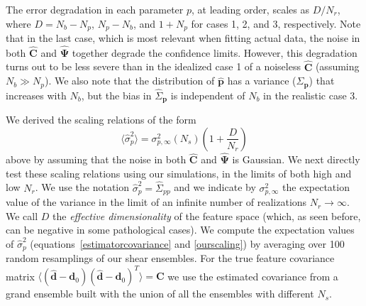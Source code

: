 \documentclass[reprint,aps,prd,superscriptaddress,showkeys,showpacs]{revtex4-1}
\newcommand{\bb}[1]{\mathbf{#1}}
\newcommand{\bbh}[1]{\mathbf{\hat{#1}}}
\newcommand{\h}[1]{\hat{#1}}
\begin{document}
%
The error degradation in each parameter $p$, at leading order, scales
as $D/N_r$, where $D=N_b-N_p$, $N_p-N_b$, and $1+N_p$ for cases 1, 2,
and 3, respectively.
Note that in the last case, which is most relevant when fitting actual
data, the noise in both $\bbh{C}$ and $\bbh{\Psi}$ together degrade
the confidence limits.  However, this degradation turns out to be less
severe than in the idealized case 1 of a noiseless $\bbh{C}$ (assuming
$N_b\gg N_p$).  We also note that the distribution of $\bbh{p}$ has a
variance ($\Sigma_\bb{p}$) that increases with $N_b$, but the bias in
$\h{\Sigma}_\bb{p}$ is independent of $N_b$ in the realistic case 3.

We derived the scaling relations of the form
%
\begin{equation}
\label{ourscaling}
\langle\h{\sigma}_p^2\rangle = \sigma^2_{p,\infty}(N_s)\left(1+\frac{D}{N_r}\right)
\end{equation}
%
above by assuming that the noise in both $\bbh{C}$ and $\bbh{\Psi}$ is
Gaussian.  We next directly test these scaling relations using our
simulations, in the limits of both high and low $N_r$.
We use the notation $\h{\sigma}^2_p=\h{\Sigma}_{pp}$ 
and we indicate by $\sigma^2_{p,\infty}$ the expectation value of the
variance in the limit of an infinite number of realizations
$N_r\rightarrow\infty$.  We call $D$ the \textit{effective
  dimensionality} of the feature space (which, as seen before, can be
negative in some pathological cases).
We compute the expectation values of $\h{\sigma}^2_p$
(equations~\ref{estimatorcovariance} and \ref{ourscaling}) by
averaging over 100 random resamplings of our shear ensembles. For the
true feature covariance matrix
$\langle(\bbh{d}-\bb{d}_0)(\bbh{d}-\bb{d}_0)^T\rangle=\bb{C}$ we use
the estimated covariance from a grand ensemble built with the union of
all the ensembles with different $N_s$.
\end{document}
